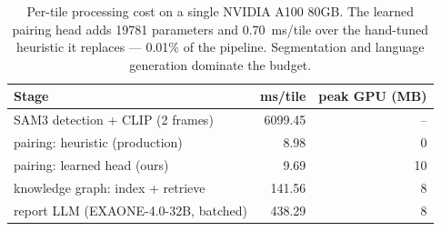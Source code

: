 \begin{table}[t]
\centering
\caption{Per-tile processing cost on a single NVIDIA A100 80GB. The learned pairing head adds 19781 parameters and 0.70~ms/tile over the hand-tuned heuristic it replaces --- 0.01\% of the pipeline. Segmentation and language generation dominate the budget.}
\label{tab:efficiency}
\setlength{\tabcolsep}{4pt}
\begin{tabular}{lrr}
\toprule
Stage & ms/tile & peak GPU (MB) \\
\midrule
SAM3 detection + CLIP (2 frames) & 6099.45 & -- \\
pairing: heuristic (production) & 8.98 & 0 \\
pairing: learned head (ours) & 9.69 & 10 \\
knowledge graph: index + retrieve & 141.56 & 8 \\
report LLM (EXAONE-4.0-32B, batched) & 438.29 & 8 \\
\bottomrule
\end{tabular}
\end{table}
